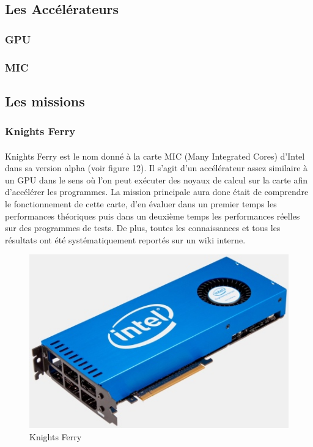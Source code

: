 \documentclass[11pt]{article}
\begin{document}
		\subsection{Les Accélérateurs}
			\subsubsection{GPU}
			\subsubsection{MIC}
		\subsection{Les missions}
			\subsubsection{Knights Ferry}
				\paragraph{}
				Knights Ferry est le nom donné à la carte MIC (Many Integrated Cores) d'Intel dans sa version alpha (voir figure 12). Il s'agit 
				d'un accélérateur assez similaire à un GPU dans le sens où l'on peut exécuter des noyaux de calcul sur la 
				carte afin d'accélérer les programmes. La mission principale aura donc était de comprendre le fonctionnement de cette
				carte, d'en évaluer dans un premier temps les performances théoriques puis dans un deuxième temps les 
				performances réelles sur des programmes de tests. De plus, toutes les connaissances et tous les résultats ont 
				été systématiquement reportés sur un wiki interne.
				\begin{figure}
				\begin{center}
				\includegraphics[scale=0.75]{IntelMIC.jpg}
				\caption{Knights Ferry}
				\end{center}
				\end{figure}
\end{document}
